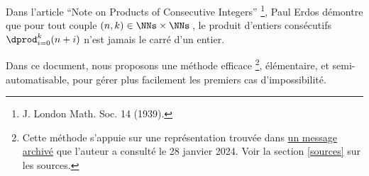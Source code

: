 Dans l'article \enquote{Note on Products of Consecutive Integers}
\footnote{
	J. London Math. Soc. 14 (1939).
},
Paul Erdos démontre que pour tout couple $(n, k) \in \NNs \times \NNs$\,, le produit d'entiers consécutifs $\dprod_{i = 0}^{k} (n + i)$ n'est jamais le carré d'un entier.

\smallskip

Dans ce document, nous proposons une méthode efficace
\footnote{
	Cette méthode s'appuie sur une représentation trouvée dans \href{https://web.archive.org/web/20171110144534/http://mathforum.org/library/drmath/view/65589.html}{un message archivé} que l'auteur a consulté le 28 janvier 2024.
	Voir la section \ref{sources} sur les sources.
},
élémentaire, et semi-automatisable, pour gérer plus facilement les premiers cas d'impossibilité.

